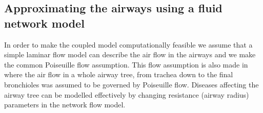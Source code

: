 %
\begin{comment}
\begin{figure}[h]
  \centering
\subfloat[]{\label{fig:pores}\texttt{[image: figures/aveolarPores\_BerkeleyLungLabLungtour.png]}}  \subfloat[]{\label{fig:honey}\texttt{[image: figures/TB\_to\_aveolarduct\_BerkeleyLungLabtour.png]}}
\caption{(a) Alveoli in an alveolar duct. The dark round openings are pores between alveoli. The alveolar wall is quite thin and contains a network of capillaries. The average diameter of one alveoli is $0.2\;\mbox{mm}$. (b) Transition from terminal bronchiole to alveolar duct, from conducting airway to oxygen transfer area, diameter of terminal bronchiole is $0.5 \;\mbox{mm}$. Images are reproduced from \cite{lunglabshort}.
 }
   \label{fig:acinar_units}
\end{figure}
%
\end{comment}

\subsection{Approximating the airways using a fluid network model}
%
In order to make the coupled model computationally feasible we assume that a simple laminar flow model can describe the air flow in the airways and we make the common {Poiseuille flow assumption}. This flow assumption is also made in \cite{Swan2012,leary2014effects} where the air flow in a whole airway tree, from trachea down to the final bronchioles was assumed to be governed by Poiseuille flow.  Diseases affecting the airway tree can be modelled effectively by changing resistance (airway radius) parameters in the network flow model.
